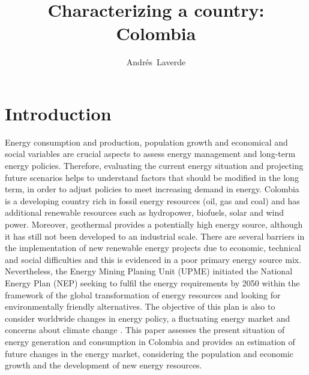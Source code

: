 \documentclass[svn, final]{rureport}
\author{Andrés~Laverde\formatemail{andres20@ru.is}}  %
\title{Characterizing a country: Colombia}  %
\begin{document}
\maketitle  %
\listoffixmes{}

\section{Introduction}
Energy consumption and production, population growth and economical and social variables are crucial aspects to assess energy management and long-term energy policies. Therefore, evaluating the current energy situation and projecting future scenarios helps to understand factors that should be modified in the long term, in order to adjust policies to meet increasing demand in energy. 
Colombia is a developing country rich in fossil energy resources (oil, gas and coal) and has additional renewable resources such as hydropower, biofuels, solar and wind power. Moreover, geothermal provides a potentially high energy source, although it has still not been developed to an industrial scale. There are several barriers in the implementation of new renewable energy projects due to economic, technical and social difficulties and this is evidenced in a poor primary energy source mix. Nevertheless, the Energy Mining Planing Unit (UPME) initiated the National Energy Plan (NEP) seeking to fulfil the energy requirements by 2050 within the framework of the global transformation of energy resources and looking for environmentally friendly alternatives. The objective of this plan is also to consider worldwide changes in energy policy, a fluctuating energy market and concerns about climate change \cite{UPME_plan2019}. This paper assesses the present situation of energy generation and consumption in Colombia and provides an estimation of future changes in the energy market, considering the population and economic growth and the development of new energy resources.
\end{document}
